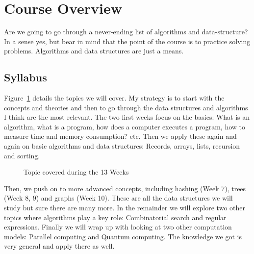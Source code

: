 \documentclass{aldast}
\begin{document}



\section{Course Overview}

Are we going to go through a never-ending list of algorithms and
data-structure? In a sense yes, but bear in mind that the point of the
course is to practice solving problems. Algorithms and data
structures are just a means.

\subsection{Syllabus}

Figure~\ref{fig:syllabus} details the topics we will cover. My
strategy is to start with the concepts and theories and then to go
through the data structures and algorithms I think are the most
relevant. The two first weeks focus on the basics: What is an
algorithm, what is a program, how does a computer executes a program,
how to measure time and memory consumption? etc. Then we apply these
again and again on basic algorithms and data structures: Records,
arrays, lists, recursion and sorting.

\begin{figure}[htbp]
  \begin{center}
    
  \end{center}
  \caption{Topic covered during the 13 Weeks}
  \label{fig:syllabus}
\end{figure}

Then, we push on to more advanced concepts, including hashing (Week
7), trees (Week 8, 9) and graphs (Week 10). These are all the data
structures we will study but sure there are many more. In the
remainder we will explore two other topics where algorithms play a key
role: Combinatorial search and regular expressions. Finally we will
wrap up with looking at two other computation models: Parallel
computing and Quantum computing. The knowledge we got is very general
and apply there as well.
\end{document}
